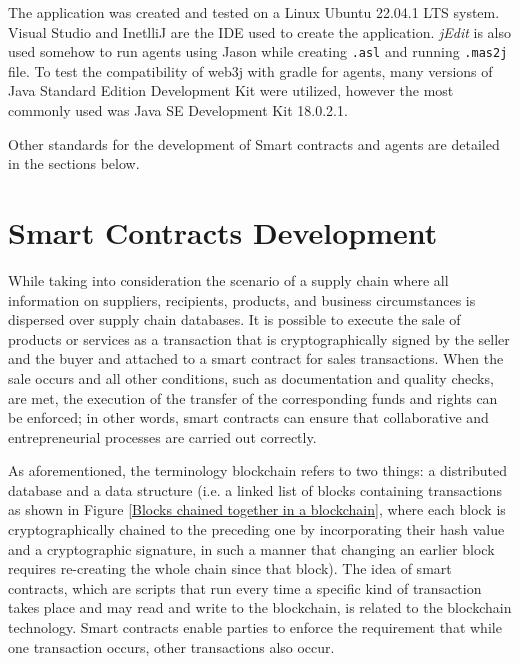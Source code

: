 The application was created and tested on a Linux Ubuntu 22.04.1 LTS system.
Visual Studio and InetlliJ are the \ac{IDE} used to create the application. \textit{jEdit} is also used somehow to run agents using Jason while creating \texttt{.asl} and running \texttt{.mas2j} file.
To test the compatibility of web3j with gradle for agents, many versions of Java Standard Edition Development Kit were utilized, however the most commonly used was Java SE Development Kit 18.0.2.1. 

\vspace{.5cm}

Other standards for the development of Smart contracts and agents are detailed in the sections below.

\section{Smart Contracts Development }   

While taking into consideration the scenario of a supply chain where all information on suppliers, recipients, products, and business circumstances is dispersed over supply chain databases.
It is possible to execute the sale of products or services as a transaction that is cryptographically signed by the seller and the buyer and attached to a smart contract for sales transactions. When the sale occurs and all other conditions, such as documentation and quality checks, are met, the execution of the transfer of the corresponding funds and rights can be enforced; in other words, smart contracts can ensure that collaborative and entrepreneurial processes are carried out correctly.

\vspace{.5cm}

As aforementioned, the terminology blockchain refers to two things: a distributed database and a data structure (i.e. a linked list of blocks containing transactions as shown in Figure \ref{Blocks chained together in a blockchain}, where each block is cryptographically chained to the preceding one by incorporating their hash value and a cryptographic signature, in such a manner that changing an earlier block requires re-creating the whole chain since that block). The idea of smart contracts, which are scripts that run every time a specific kind of transaction takes place and may read and write to the blockchain, is related to the blockchain technology. Smart contracts enable parties to enforce the requirement that while one transaction occurs, other transactions also occur.

